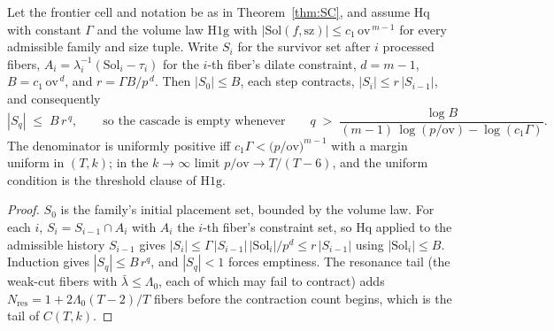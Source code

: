 \begin{proposition}\label{prop:Hq}
Let the frontier cell and notation be as in Theorem~\ref{thm:SC}, and
assume $\mathrm{Hq}$ with constant $\Gamma$ and the volume law
$\mathrm{H1g}$ with $|\mathrm{Sol}(f,\mathrm{sz})|\le
c_1\,\mathrm{ov}^{\,m-1}$ for every admissible family and size tuple.
Write $S_i$ for the survivor set after $i$ processed fibers,
$A_i=\lambda_i^{-1}(\mathrm{Sol}_i-\tau_i)$ for the $i$-th fiber's
dilate constraint, $d=m-1$, $B=c_1\,\mathrm{ov}^{\,d}$, and
$r=\Gamma B/p^{\,d}$. Then $|S_0|\le B$, each step contracts,
$|S_i|\le r\,|S_{i-1}|$, and consequently
\[
|S_q|\;\le\;B\,r^{\,q},
\qquad\text{so the cascade is empty whenever}\qquad
q\;>\;\frac{\log B}{(m-1)\,\log(p/\mathrm{ov})-\log(c_1\Gamma)}.
\]
The denominator is uniformly positive iff
$c_1\Gamma<\bigl(p/\mathrm{ov}\bigr)^{m-1}$ with a margin uniform in
$(T,k)$; in the $k\to\infty$ limit $p/\mathrm{ov}\to T/(T-6)$, and the
uniform condition is the threshold clause of $\mathrm{H1g}$.
\end{proposition}

\begin{proof}
$S_0$ is the family's initial placement set, bounded by the volume law.
For each $i$, $S_i=S_{i-1}\cap A_i$ with $A_i$ the $i$-th fiber's
constraint set, so $\mathrm{Hq}$ applied to the admissible history
$S_{i-1}$ gives $|S_i|\le\Gamma\,|S_{i-1}|\,|\mathrm{Sol}_i|/p^{d}\le
r\,|S_{i-1}|$ using $|\mathrm{Sol}_i|\le B$. Induction gives
$|S_q|\le B\,r^{q}$, and $|S_q|<1$ forces emptiness. The resonance tail
(the weak-cut fibers with $\bar\lambda\le\Lambda_0$, each of which may
fail to contract) adds $N_{\mathrm{res}}=1+2\Lambda_0(T-2)/T$ fibers
before the contraction count begins, which is the tail of $C(T,k)$.
\end{proof}


